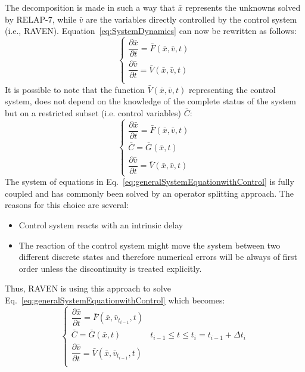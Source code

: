 \documentclass{mc2013}
\begin{document}
The decomposition is made in such a way that $\bar{x}$ represents the unknowns solved by RELAP-7, while $\bar{v}$ are the variables directly controlled by the control system (i.e., RAVEN). Equation~\ref{eq:SystemDynamics} can now be rewritten as follows:
\begin{equation}
\begin{cases} 
\dfrac{\partial \bar{x}}{\partial t} = \bar{F}(\bar{x},\bar{v},t) \\ 
\dfrac{\partial \bar{v}}{\partial t} = \bar{V}(\bar{x},\bar{v},t) \\
\end{cases}
\label{eq:generalSystemEquation}
\end{equation}
It is possible to note that the function $\bar{V}(\bar{x},\bar{v},t)$ representing the control system, does not depend on the knowledge of the complete status of the system but on a restricted subset (i.e. control variables) $\bar{C}$:
\begin{equation}
\begin{cases} 
\dfrac{\partial \bar{x}}{\partial t} = \bar{F}(\bar{x},\bar{v},t) \\
\bar{C} = \bar{G}(\bar{x},t) \\ 
\dfrac{\partial \bar{v}}{\partial t} = \bar{V}(\bar{x},\bar{v},t) 
\end{cases}
\label{eq:generalSystemEquationwithControl}
\end{equation}
The system of equations in Eq.~\ref{eq:generalSystemEquationwithControl} is fully coupled and has commonly been solved by an operator splitting approach. The reasons for this choice are several:
\begin{itemize}
\item Control system reacts with an intrinsic delay
\item The reaction of the control system might move the system between two different discrete states and
therefore numerical errors will be always of first order unless the discontinuity is treated explicitly.
\end{itemize}
Thus, RAVEN is using this approach to solve Eq.~\ref{eq:generalSystemEquationwithControl} which becomes:
\begin{equation}
\begin{cases} 
\dfrac{\partial \bar{x}}{\partial t} = \bar{F}(\bar{x},\bar{v}_{t_{i-1}},t) \\
\bar{C} = \bar{G}(\bar{x},t) & t_{i-1}\leq t\leq t_{i} = t_{i-1} + \Delta t_{i}\\ 
\dfrac{\partial \bar{v}}{\partial t} = \bar{V}(\bar{x},\bar{v}_{t_{i-1}},t) \\
\end{cases}
\label{eq:generalSystemEquationwithControlSplitting}
\end{equation}
\end{document}
